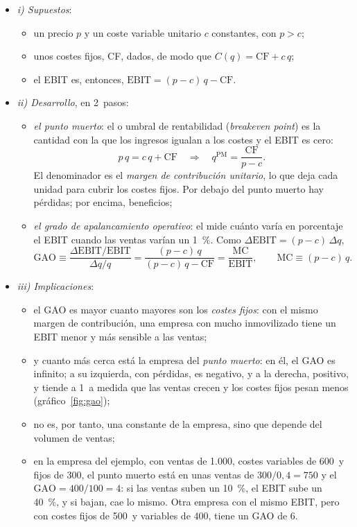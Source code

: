 \documentclass[11pt]{article}
\begin{document}
\begin{itemize}
\item \emph{i) Supuestos}:
  \begin{itemize}
  \item un precio $p$ y un coste variable unitario $c$ constantes, con $p>c$;
  \item unos costes fijos, CF, dados, de modo que $C(q)=\mathrm{CF}+c\,q$;
  \item el EBIT es, entonces, $\mathrm{EBIT}=(p-c)\,q-\mathrm{CF}$.
  \end{itemize}
\item \emph{ii) Desarrollo}, en 2~pasos:
  \begin{itemize}
  \item \emph{el punto muerto}: el  o umbral de rentabilidad (\emph{breakeven point}) es la cantidad con la que los ingresos igualan a los costes y el EBIT es cero:
    \[
    p\,q=c\,q+\mathrm{CF}\quad\Longrightarrow\quad q^{\mathrm{PM}}=\frac{\mathrm{CF}}{p-c}.
    \]
    El denominador es el \emph{margen de contribución unitario}, lo que deja cada unidad para cubrir los costes fijos. Por debajo del punto muerto hay pérdidas; por encima, beneficios;
  \item \emph{el grado de apalancamiento operativo}: el  mide cuánto varía en porcentaje el EBIT cuando las ventas varían un 1~\%. Como $\Delta\mathrm{EBIT}=(p-c)\,\Delta q$,
    \[
    \mathrm{GAO}\equiv\frac{\Delta\mathrm{EBIT}/\mathrm{EBIT}}{\Delta q/q}=\frac{(p-c)\,q}{(p-c)\,q-\mathrm{CF}}=\frac{\mathrm{MC}}{\mathrm{EBIT}},\qquad \mathrm{MC}\equiv(p-c)\,q.
    \]
  \end{itemize}
\item \emph{iii) Implicaciones}:
  \begin{itemize}
  \item el GAO es mayor cuanto mayores son los \emph{costes fijos}: con el mismo margen de contribución, una empresa con mucho inmovilizado tiene un EBIT menor y más sensible a las ventas;
  \item y cuanto más cerca está la empresa del \emph{punto muerto}: en él, el GAO es infinito; a su izquierda, con pérdidas, es negativo, y a la derecha, positivo, y tiende a 1~a medida que las ventas crecen y los costes fijos pesan menos (gráfico~\ref{fig:gao});
  \item no es, por tanto, una constante de la empresa, sino que depende del volumen de ventas;
  \item en la empresa del ejemplo, con ventas de 1.000, costes variables de 600~y fijos de 300, el punto muerto está en unas ventas de $300/0{,}4=750$ y el $\mathrm{GAO}=400/100=4$: si las ventas suben un 10~\%, el EBIT sube un 40~\%, y si bajan, cae lo mismo. Otra empresa con el mismo EBIT, pero con costes fijos de 500~y variables de 400, tiene un GAO de 6.
  \end{itemize}
\end{itemize}
\end{document}
